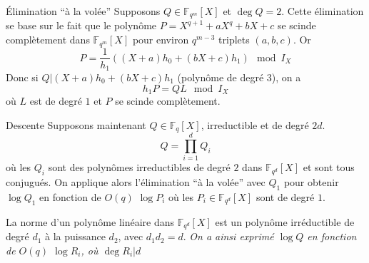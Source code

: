 \documentclass[xcolor=x11names,compress]{beamer}
\theoremstyle{break}
\theoremstyle{sc}
\theoremstyle{definition}
\theoremstyle{remark}
\begin{document}
\begin{frame}{Élimination ``à la volée''}
  Supposons $Q\in \mathbb{F}_{q^m}[X]$ et $\deg Q = 2$. Cette élimination se base
  sur le fait que le polynôme $P = X^{q+1}+aX^q+bX+c$ se scinde complètement
  dans $\mathbb{F}_{q^m}[X]$ pour
  environ $q^{m-3}$ triplets $(a, b, c)$. Or 
  \[
    P = \frac{1}{h_1}((X+a)h_0 + (bX+c)h_1)\mod I_X
  \]
  Donc si $Q| (X+a)h_0 + (bX+c)h_1$ (polynôme de degré $3$), on a 
  \[
    h_1P=QL \mod I_X
  \]
  où $L$ est de degré $1$ et $P$ se scinde complètement.

\end{frame}

\begin{frame}{Descente}
  Supposons maintenant $Q\in\mathbb{F}_{q}[X]$, irreductible et de degré $2d$.
  \[
    Q=\prod_{i=1}^d Q_i
  \]
  où les $Q_i$ sont des polynômes irreductibles de degré $2$ dans
  $\mathbb{F}_{q^d}[X]$ et sont tous conjugués. On applique alors
  l'élimination ``à la volée'' avec $Q_1$ pour obtenir $\log Q_1$ en fonction
  de $O(q)$ $\log P_i$ où les $P_i\in \mathbb{F}_{q^d}[X]$ sont de degré $1$.
  
  La norme d'un polynôme linéaire dans $\mathbb{F}_{q^d}[X]$ est un polynôme
  irréductible de degré $d_1$ à la puissance $d_2$, avec $d_1d_2 = d$.
  \emph{On a ainsi exprimé $\log Q$ en fonction de $O(q)$ $\log R_i$, où $\deg
  R_i | d$}
\end{frame}

\end{document}
